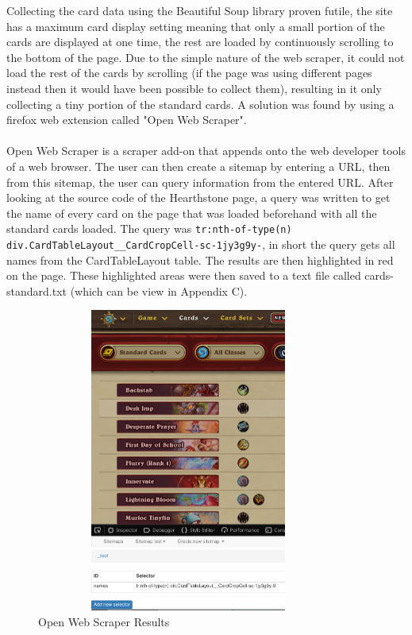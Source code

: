\documentclass{report} %
\begin{document}
\indent Collecting the card data using the Beautiful Soup library proven futile, the site has a maximum card display setting meaning that only a small portion of the cards are displayed at one time, the rest are loaded by continuously scrolling to the bottom of the page. Due to the simple nature of the web scraper, it could not load the rest of the cards by scrolling (if the page was using different pages instead then it would have been possible to collect them), resulting in it only collecting a tiny portion of the standard cards. A solution was found by using a firefox web extension called "Open Web Scraper"\footnotemark. \\ \\
Open Web Scraper is a scraper add-on that appends onto the web developer tools of a web browser. The user can then create a sitemap by entering a URL, then from this sitemap, the user can query information from the entered URL. After looking at the source code of the Hearthstone page, a query was written to get the name of every card on the page that was loaded beforehand with all the standard cards loaded. The query was \nolinkurl{tr:nth-of-type(n) div.CardTableLayout__CardCropCell-sc-1jy3g9y-}, in short the query gets all names from the CardTableLayout table. The results are then highlighted in red on the page. These highlighted areas were then saved to a text file called cards-standard.txt (which can be view in Appendix C).

\begin{figure}[H]
\centering
\includegraphics[width=10cm,height=10cm,keepaspectratio]{OpenWebScraper}
\caption{Open Web Scraper Results\protect}
 \label{board}
\end{figure}
\end{document}
